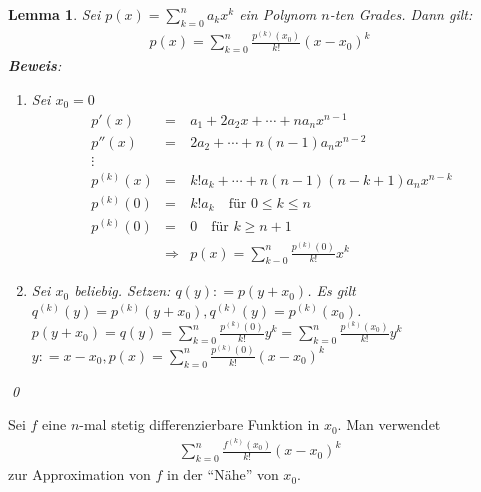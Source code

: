 \documentclass[ngerman,titlepage,twoside, parskip=half*]{scrreprt}
\theoremstyle{plain}
\newtheorem{lemma}{Lemma}
\theoremstyle{definition}
\theoremstyle{remark}
\newcommand*{\coloneqq}{\mathrel{\mathop:}=}
\begin{document}
\begin{lemma}
  Sei $p(x)=\sum_{k=0}^n a_kx^k$ ein Polynom $n$-ten Grades. Dann gilt:
  \begin{gather*}p(x)=\sum_{k=0}^n \frac{p^{(k)}(x_0)}{k!} (x-x_0)^k\end{gather*}
  \textbf{Beweis}:
  \begin{enumerate}[1. F{a}ll]
    \item Sei $x_0=0$
      \begin{align*}
	p'(x)&=& a_1+2a_2x+\cdots+na_nx^{n-1}\\
	p''(x)&=& 2a_2+\cdots+n(n-1)a_nx^{n-2}\\
	\vdots\\
	p^{(k)}(x)&=& k!a_k+\cdots+n(n-1)(n-k+1)a_nx^{n-k}\\
	p^{(k)}(0)&=& k!a_k \quad\text{für } 0\leq k\leq n\\
	p^{(k)}(0)&=& 0 \quad\text{für } k\geq n+1\\
	&\Rightarrow & p(x)=\sum_{k-0}^n \frac{p^{(k)}(0)}{k!}x^k
      \end{align*}
    \item Sei $x_0$ beliebig. Setzen: $q(y)\coloneqq p(y+x_0)$. Es gilt $q^{(k)}
      (y)=p^{(k)}(y+x_0), q^{(k)}(y)=p^{(k)}(x_0)$.\\
      $p(y+x_0)=q(y)=\sum_{k=0}^n \frac{p^{(k)}(0)}{k!}y^k=\sum_{k=0}^n
      \frac{p^{(k)}(x_0)}{k!}y^k$\\
      $y\coloneqq x-x_0, p(x)=\sum_{k=0}^n \frac{p^{(k)}(0)}{k!}(x-x_0)^k$
  \end{enumerate}
  \qed
\end{lemma}

Sei $f$ eine $n$-mal stetig differenzierbare Funktion in $x_0$. Man
verwendet 
\begin{gather*}\sum_{k=0}^n \frac{f^{(k)}(x_0)}{k!}(x-x_0)^k\end{gather*}
zur Approximation von $f$ in der "`Nähe"' von $x_0$.
\end{document}
